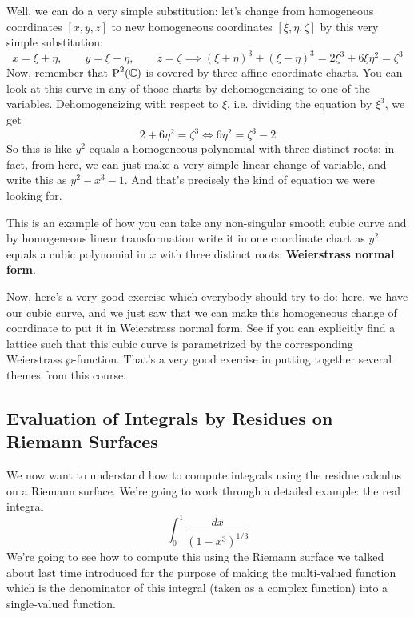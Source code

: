 \documentclass{article}
\begin{document}
\begin{enumerate}
  Well, we can do a very simple substitution: let's change from homogeneous coordinates \([x, y, z]\) to new homogeneous coordinates \([\xi, \eta, \zeta]\) by this very simple substitution:
  \begin{equation}
    x = \xi + \eta, \qquad y = \xi - \eta, \qquad z = \zeta \implies (\xi + \eta)^3 + (\xi - \eta)^3 = 2\xi^3 + 6\xi\eta^2 = \zeta^3
  \end{equation}
  Now, remember that \(\operatorname{P}^{2}({\mathbb{C}})\) is covered by three affine coordinate charts. You can look at this curve in any of those charts by dehomogeneizing to one of the variables. Dehomogeneizing with respect to \(\xi\), i.e. dividing the equation by \(\xi^3\), we get
  \begin{equation}
    2 + 6\eta^2 = \zeta^3 \iff 6\eta^2 = \zeta^3 - 2
  \end{equation}
  So this is like \(y^2\) equals a homogeneous polynomial with three distinct roots: in fact, from here, we can just make a very simple linear change of variable, and write this as \(y^2 - x^3 - 1\). And that's precisely the kind of equation we were looking for.

  This is an example of how you can take any non-singular smooth cubic curve and by homogeneous linear transformation write it in one coordinate chart as \(y^2\) equals a cubic polynomial in \(x\) with three distinct roots: \textbf{Weierstrass normal form}.

  Now, here's a very good exercise which everybody should try to do:
  here, we have our cubic curve, and we just saw that we can make this homogeneous change of coordinate to put it in Weierstrass normal form. See if you can explicitly find a lattice such that this cubic curve is parametrized by the corresponding Weierstrass \(\wp\)-function. That's a very good exercise in putting together several themes from this course.

\end{enumerate}

\subsection{Evaluation of Integrals by Residues on Riemann Surfaces}

We now want to understand how to compute integrals using the residue calculus on a Riemann surface. We're going to work through a detailed example: the real integral
\begin{equation}
  \int_0^1\frac{dx}{(1 - x^3)^{1/3}}
\end{equation}
We're going to see how to compute this using the Riemann surface we talked about last time introduced for the purpose of making the multi-valued function which is the denominator of this integral (taken as a complex function) into a single-valued function.
\end{document}
